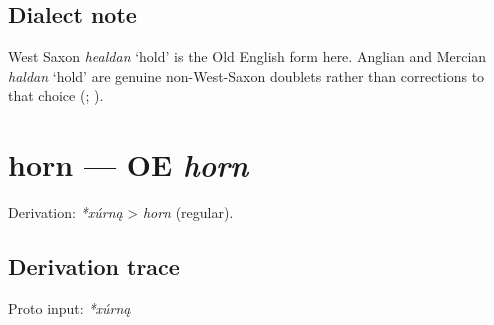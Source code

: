 \documentclass[
  british,
  a4paper,
  openany]{book}
\providecommand{\texorpdfstring}[2]{#1}
\begin{document}
\subsection{Dialect note}\label{dialect-note-2}

West Saxon {\emph{healdan}} `hold' is the Old English form here. Anglian
and Mercian {\emph{haldan}} `hold' are genuine non-West-Saxon doublets
rather than corrections to that choice
(;
).

\section{\texorpdfstring{horn --- OE
\emph{horn}}{horn --- OE horn}}\label{horn-oe-horn}


Derivation: \emph{*xúrną} \textgreater{} \emph{horn} (regular).

\subsection{Derivation trace}\label{derivation-trace-32}

Proto input: \emph{*xúrną}

\begingroup
\setlength{\fboxsep}{6pt}
\end{document}
